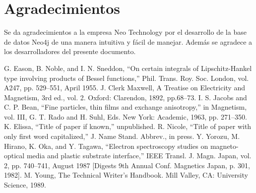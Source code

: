 \documentclass[conference]{IEEEtran}
\begin{document}
\section*{Agradecimientos}

Se da agradecimientos a la empresa Neo Technology por el desarrollo de la base de datos Neo4j de una manera intuitiva y fácil de manejar. Además se agradece a los desarrolladores del presente documento.


\begin{thebibliography}{00}
 G. Eason, B. Noble, and I. N. Sneddon, ``On certain integrals of Lipschitz-Hankel type involving products of Bessel functions,'' Phil. Trans. Roy. Soc. London, vol. A247, pp. 529--551, April 1955.
 J. Clerk Maxwell, A Treatise on Electricity and Magnetism, 3rd ed., vol. 2. Oxford: Clarendon, 1892, pp.68--73.
 I. S. Jacobs and C. P. Bean, ``Fine particles, thin films and exchange anisotropy,'' in Magnetism, vol. III, G. T. Rado and H. Suhl, Eds. New York: Academic, 1963, pp. 271--350.
 K. Elissa, ``Title of paper if known,'' unpublished.
 R. Nicole, ``Title of paper with only first word capitalized,'' J. Name Stand. Abbrev., in press.
 Y. Yorozu, M. Hirano, K. Oka, and Y. Tagawa, ``Electron spectroscopy studies on magneto-optical media and plastic substrate interface,'' IEEE Transl. J. Magn. Japan, vol. 2, pp. 740--741, August 1987 [Digests 9th Annual Conf. Magnetics Japan, p. 301, 1982].
 M. Young, The Technical Writer's Handbook. Mill Valley, CA: University Science, 1989.
\end{thebibliography}
\end{document}
